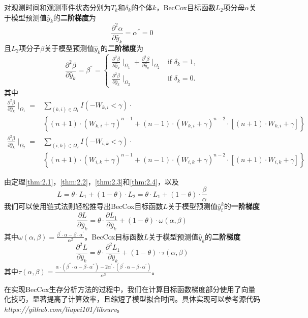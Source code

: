 \begin{theorem}\label{thm:2.4}
对观测时间和观测事件状态分别为$T_k$和$\delta_k$的个体$k$，BecCox目标函数$L_2$项分母$\alpha$关于模型预测值$\hat{y}_k$的\textbf{二阶梯度}为$$
\frac{\partial^2 \alpha}{\partial \hat{y}_k}=\alpha^{''}=0
$$ 且$L_2$项分子$\beta$关于模型预测值$\hat{y}_k$的\textbf{二阶梯度}为$$
\frac{\partial^2 \beta}{\partial \hat{y}_k}=\beta^{''}=
\begin{cases}
\frac{\partial^2 \beta}{\partial \hat{y}_k} \mid_{\Omega_1} + \frac{\partial^2 \beta}{\partial \hat{y}_k} \mid_{\Omega_2} & \text{if } \delta_k = 1,\\
\frac{\partial^2 \beta}{\partial \hat{y}_k} \mid_{\Omega_2} & \text{if } \delta_k = 0.
\end{cases}
$$ 其中\[
\begin{split}
\frac{\partial^2 \beta}{\partial \hat{y}_k} \mid_{\Omega_1} =& \sum\limits_{(k,i)\in \Omega_1} I(-W_{k,i}<\gamma)\cdot \\
  & \left\{(n+1)\cdot (W_{k,i}+\gamma)^{n-1} + (n-1)\cdot (W_{k,i}+\gamma)^{n-2}\cdot [(n+1)\cdot W_{k,i}+\gamma]\right\} \\
\frac{\partial^2 \beta}{\partial \hat{y}_k} \mid_{\Omega_2} =& \sum\limits_{(i,k)\in \Omega_2} I(-W_{i,k}<\gamma)\cdot \\
  & \left\{(n+1)\cdot (W_{i,k}+\gamma)^{n-1} + (n-1)\cdot (W_{i,k}+\gamma)^{n-2}\cdot [(n+1)\cdot W_{i,k}+\gamma]\right\}
\end{split}
\]
\end{theorem}

由定理\ref{thm:2.1}，\ref{thm:2.2}，\ref{thm:2.3}和\ref{thm:2.4}，以及$$
L=\theta\cdot L_1 + (1-\theta)\cdot L_2= \theta\cdot L_1 + (1-\theta)\cdot \frac{\beta}{\alpha}
$$ 我们可以使用链式法则轻松推导出BecCox目标函数$L$关于模型预测值$\hat{y}_t^k$的\textbf{一阶梯度}$$
\frac{\partial L}{\partial \hat{y}_k}=\theta\cdot \frac{\partial L_1}{\partial \hat{y}_k} + (1-\theta)\cdot \omega(\alpha, \beta)
$$ 其中$\omega(\alpha, \beta)=\frac{\beta^{'}\cdot \alpha - \beta\cdot \alpha^{'}}{\alpha^2}$。BecCox目标函数$L$关于模型预测值$\hat{y}_k$的\textbf{二阶梯度}$$
\frac{\partial^2 L}{\partial \hat{y}_k}=\theta\cdot \frac{\partial^2 L_1}{\partial \hat{y}_k} + (1-\theta)\cdot \tau(\alpha, \beta)
$$ 其中$\tau(\alpha, \beta)=\frac{\alpha\cdot (\beta^{''}\cdot \alpha - \beta\cdot \alpha^{''})-2\alpha^{'}\cdot (\beta^{'}\cdot \alpha - \beta\cdot \alpha^{'})}{\alpha^3}$。

在实现BecCox生存分析方法的过程中，我们在计算目标函数梯度部分使用了向量化技巧，显著提高了计算效率，且缩短了模型拟合时间。具体实现可以参考源代码\emph{https://github.com/liupei101/libsurv}。

